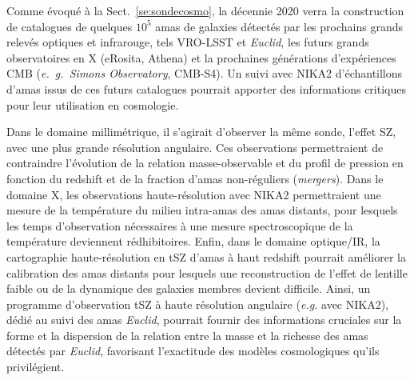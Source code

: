 Comme évoqué à la Sect.~\ref{se:sondecosmo}, la décennie 2020 verra la
construction de catalogues de quelques $10^5$ amas de galaxies
détectés par les prochains grands relevés optiques et infrarouge, tels
VRO-LSST et \emph{Euclid}, les futurs grands observatoires en X (eRosita,
Athena) et la prochaines générations d'expériences CMB
(\emph{e.~g.~}\emph{Simons Observatory}, CMB-S4). Un suivi avec NIKA2 
d'échantillons d'amas issus de ces futurs catalogues pourrait apporter
des informations critiques pour leur utilisation en cosmologie. 

Dans le domaine millimétrique, il s'agirait d'observer la même sonde,
l'effet SZ, avec une plus grande résolution angulaire. Ces
observations permettraient de contraindre l'évolution de la relation
masse-observable et du profil de pression en fonction du redshift et
de la fraction d'amas non-réguliers (\emph{mergers}). Dans le domaine
X, les observations haute-résolution avec NIKA2 permettraient une
mesure de la température du milieu intra-amas des amas distants, pour
lesquels les temps d'observation nécessaires à une mesure
spectroscopique de la température deviennent rédhibitoires. 
Enfin, dans le domaine optique/IR, la cartographie haute-résolution en
tSZ d'amas à haut redshift pourrait améliorer la calibration des amas
distants pour lesquels une reconstruction de l'effet de lentille
faible ou de la dynamique des galaxies membres devient
difficile. Ainsi, un programme d'observation tSZ à haute résolution angulaire (\emph{e.g.} avec NIKA2), dédié au suivi des amas \emph{Euclid}, pourrait fournir des informations cruciales sur la forme et la dispersion de la relation entre la masse et la richesse des amas détectés par
\emph{Euclid}, favorisant l'exactitude des modèles cosmologiques qu'ils privilégient. 




